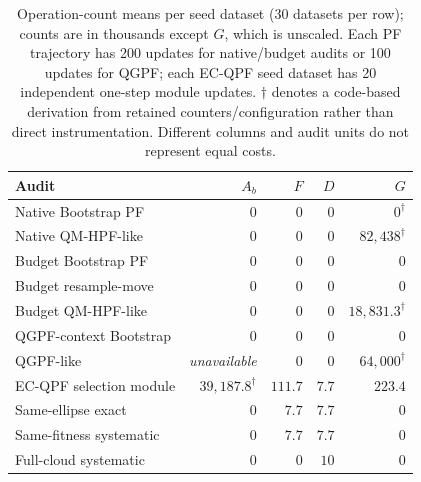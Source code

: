 \begin{table}[htbp]
\centering
\scriptsize
\setlength{\tabcolsep}{3pt}
\begin{tabular}{lrrrr}
\toprule
Audit & $A_b$ & $F$ & $D$ & $G$ \\
\midrule
Native Bootstrap PF & $0$ & $0$ & $0$ & $0^{\dagger}$ \\
Native QM-HPF-like & $0$ & $0$ & $0$ & $82,438^{\dagger}$ \\
Budget Bootstrap PF & $0$ & $0$ & $0$ & $0$ \\
Budget resample-move & $0$ & $0$ & $0$ & $0$ \\
Budget QM-HPF-like & $0$ & $0$ & $0$ & $18,831.3^{\dagger}$ \\
QGPF-context Bootstrap & $0$ & $0$ & $0$ & $0$ \\
QGPF-like & \textit{unavailable} & $0$ & $0$ & $64,000^{\dagger}$ \\
EC-QPF selection module & $39,187.8^{\dagger}$ & $111.7$ & $7.7$ & $223.4$ \\
Same-ellipse exact & $0$ & $7.7$ & $7.7$ & $0$ \\
Same-fitness systematic & $0$ & $7.7$ & $7.7$ & $0$ \\
Full-cloud systematic & $0$ & $0$ & $10$ & $0$ \\
\bottomrule
\end{tabular}
\caption{Operation-count means per seed dataset (30 datasets per row); counts are in thousands except $G$, which is unscaled. Each PF trajectory has 200 updates for native/budget audits or 100 updates for QGPF; each EC-QPF seed dataset has 20 independent one-step module updates. $\dagger$ denotes a code-based derivation from retained counters/configuration rather than direct instrumentation. Different columns and audit units do not represent equal costs.}
\label{tab:audit-counts-additional}
\end{table}
